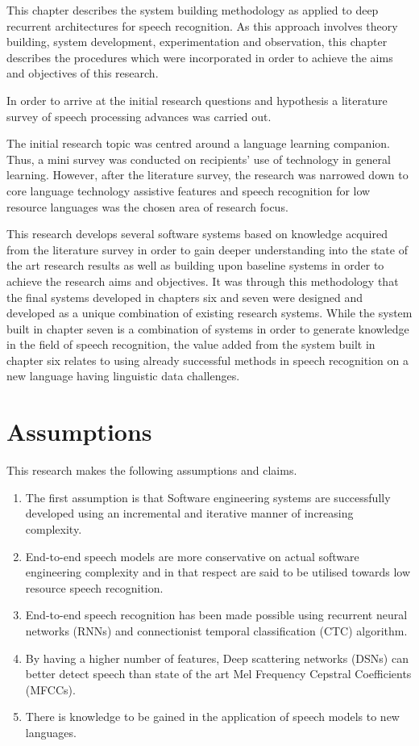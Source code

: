 This chapter describes the system building methodology  \citep{nunamaker1990systems} as applied to deep recurrent architectures for speech recognition.  As this approach involves theory building, system development, experimentation and observation, this chapter describes the procedures which were incorporated in order to achieve the aims and objectives of this research.

In order to arrive at the initial research questions and hypothesis a literature survey  of speech processing advances was carried out.  

The initial research topic was centred around a language learning companion.  Thus, a mini survey was conducted on recipients' use of technology in general learning.  However, after the literature survey, the research was narrowed down to core language technology assistive features and speech recognition for low resource languages was the chosen area of research focus.

This research develops several software systems based on knowledge acquired from the literature survey in order to gain deeper understanding into the state of the art research results as well as building upon baseline systems in order to achieve the research aims and objectives.  It was through this methodology that the final systems developed in chapters six and seven were designed and developed as a unique combination of existing research systems.  While the system built in chapter seven is a combination of systems in order to generate knowledge in the field of speech recognition, the value added from the system built in chapter six relates to using already successful methods in speech recognition on a new language having linguistic data challenges. 

\section{Assumptions}
This research makes the following assumptions and claims.
\begin{enumerate}
    \item The first assumption is that Software engineering systems are successfully developed using an incremental and iterative manner of increasing complexity.
    \item End-to-end speech models are more conservative on actual software engineering complexity and in that respect are said to be utilised towards low resource speech recognition.
    \item End-to-end speech recognition has been made possible using recurrent neural networks (RNNs) and connectionist temporal classification (CTC) algorithm.
    \item By having a higher number of features, Deep scattering networks (DSNs) can better detect speech than state of the art Mel Frequency Cepstral Coefficients (MFCCs).
    \item There is knowledge to be gained in the application of speech models to new languages.
\end{enumerate}

